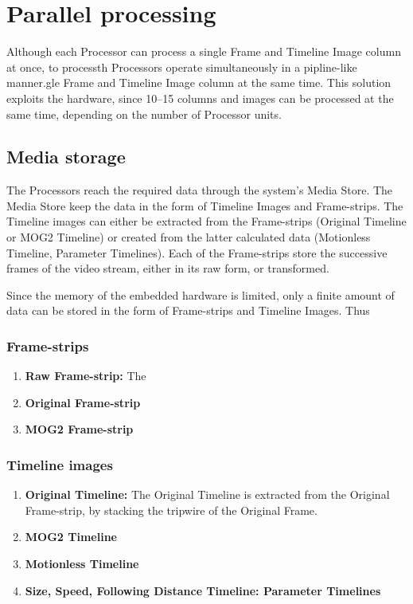 \section{Parallel processing}
Although each Processor can process a single Frame and Timeline Image column at once, to processth Processors operate simultaneously in a pipline-like manner.gle Frame and Timeline Image column at the same time.
This solution exploits the hardware, since 10--15 columns and images can be processed at the same time, depending on the number of Processor units.

\subsection{Media storage}
The Processors reach the required data through the system's Media Store.
The Media Store keep the data in the form of Timeline Images and Frame-strips.
The Timeline images can either be extracted from the Frame-strips (Original Timeline or MOG2 Timeline) or created from the latter calculated data (Motionless Timeline, Parameter Timelines).
Each of the Frame-strips store the successive frames of the video stream, either in its raw form, or transformed.

Since the memory of the embedded hardware is limited, only a finite amount of data can be stored in the form of Frame-strips and Timeline Images.
Thus 

\subsubsection{Frame-strips}
\begin{enumerate}
	\item \textbf{Raw Frame-strip:} The
	\item \textbf{Original Frame-strip}
	\item \textbf{MOG2 Frame-strip}
\end{enumerate}

\subsubsection{Timeline images}
\begin{enumerate}
	\item \textbf{Original Timeline:} The Original Timeline is extracted from the Original Frame-strip, by stacking the tripwire of the Original Frame.
	\item \textbf{MOG2 Timeline} 
	\item \textbf{Motionless Timeline}
	\item \textbf{Size, Speed, Following Distance Timeline: Parameter Timelines}
\end{enumerate}

